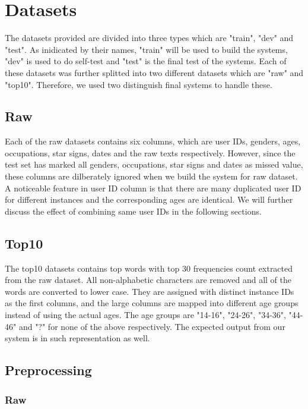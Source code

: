 \documentclass[10pt]{article}
\begin{document}
\section{Datasets}

The datasets \cite{dataset} provided are divided into three types which are "train", "dev" and "test". As inidicated by their names, "train" will be used to build the systems, "dev" is used to do self-test and "test" is the final test of the systems. Each of these datasets was further splitted into two different datasets which are "raw" and "top10". Therefore, we used two distinguish final systems to handle these.

\subsection{Raw}

Each of the raw datasets contains six columns, which are user IDs, genders, ages, occupations, star signs, dates and the raw texts respectively. However, since the test set has marked all genders, occupations, star signs and dates as missed value, these columns are dilberately ignored when we build the system for raw dataset. A noticeable feature in user ID column is that there are many duplicated user ID for different instances and the corresponding ages are identical. We will further discuss the effect of combining same user IDs in the following sections.

\subsection{Top10}

The top10 datasets contains top words with top 30 frequencies count extracted from the raw dataset. All non-alphabetic characters are removed and all of the words are converted to lower case. They are assigned with distinct instance IDs as the first columns, and the large columns are mapped into different age groups instead of using the actual ages. The age groups are "14-16", "24-26", "34-36", "44-46" and "?" for none of the above respectively. The expected output from our system is in such representation as well.

\subsection{Preprocessing}

\subsubsection{Raw}
\end{document}
